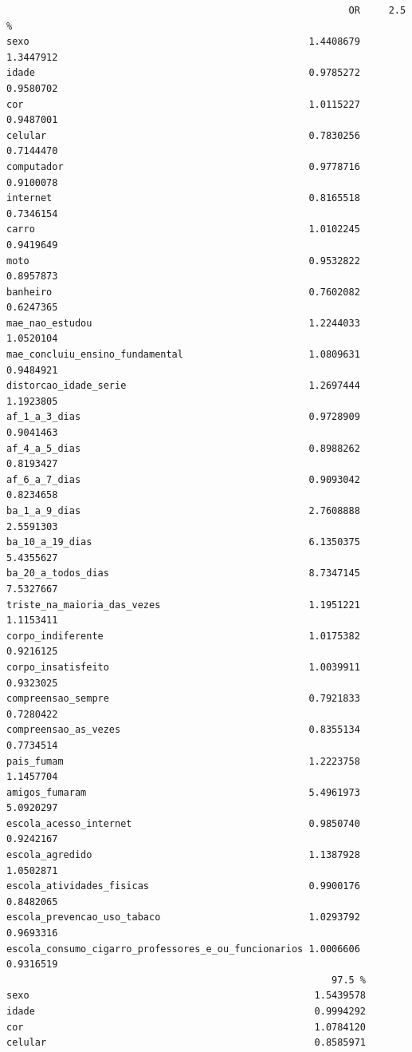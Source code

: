 \documentclass[
]{article}
\begin{document}
\begin{verbatim}
                                                            OR     2.5 %
sexo                                                 1.4408679 1.3447912
idade                                                0.9785272 0.9580702
cor                                                  1.0115227 0.9487001
celular                                              0.7830256 0.7144470
computador                                           0.9778716 0.9100078
internet                                             0.8165518 0.7346154
carro                                                1.0102245 0.9419649
moto                                                 0.9532822 0.8957873
banheiro                                             0.7602082 0.6247365
mae_nao_estudou                                      1.2244033 1.0520104
mae_concluiu_ensino_fundamental                      1.0809631 0.9484921
distorcao_idade_serie                                1.2697444 1.1923805
af_1_a_3_dias                                        0.9728909 0.9041463
af_4_a_5_dias                                        0.8988262 0.8193427
af_6_a_7_dias                                        0.9093042 0.8234658
ba_1_a_9_dias                                        2.7608888 2.5591303
ba_10_a_19_dias                                      6.1350375 5.4355627
ba_20_a_todos_dias                                   8.7347145 7.5327667
triste_na_maioria_das_vezes                          1.1951221 1.1153411
corpo_indiferente                                    1.0175382 0.9216125
corpo_insatisfeito                                   1.0039911 0.9323025
compreensao_sempre                                   0.7921833 0.7280422
compreensao_as_vezes                                 0.8355134 0.7734514
pais_fumam                                           1.2223758 1.1457704
amigos_fumaram                                       5.4961973 5.0920297
escola_acesso_internet                               0.9850740 0.9242167
escola_agredido                                      1.1387928 1.0502871
escola_atividades_fisicas                            0.9900176 0.8482065
escola_prevencao_uso_tabaco                          1.0293792 0.9693316
escola_consumo_cigarro_professores_e_ou_funcionarios 1.0006606 0.9316519
                                                         97.5 %
sexo                                                  1.5439578
idade                                                 0.9994292
cor                                                   1.0784120
celular                                               0.8585971

\end{verbatim}
\end{document}
